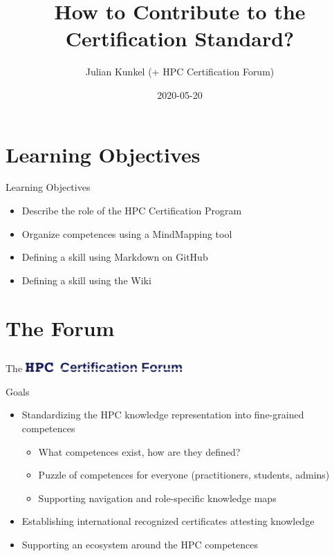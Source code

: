 \documentclass[compress,aspectratio=169]{beamer}
\subtitle{}
\title{\Large  How to Contribute to the Certification Standard?}
\author{Julian Kunkel (+ HPC Certification Forum)}
\date{2020-05-20}
\institute{Department of Computer Science}
\begin{document}
\begin{frame}[plain]{}
	\maketitle
\end{frame}

\section{Learning Objectives}

\begin{frame}{Learning Objectives}
\begin{itemize}
  \item Describe the role of the HPC Certification Program
  \item Organize competences using a MindMapping tool
  \item Defining a skill using Markdown on GitHub
  \item Defining a skill using the Wiki
\end{itemize}
\end{frame}


\section{The Forum}
\subsection{}



\begin{frame}{The \includegraphics[width=0.45\textwidth]{hpccf-full}}
		\begin{block}{Goals}
			\begin{itemize}
				\item Standardizing the HPC knowledge representation into fine-grained competences
          \begin{itemize}
            \item What competences exist, how are they defined?
            \item Puzzle of competences for everyone (practitioners, students, admins)
            \item Supporting navigation and role-specific knowledge maps
          \end{itemize}
				\item Establishing international recognized certificates attesting knowledge
        \item Supporting an ecosystem around the HPC competences
			\end{itemize}
		\end{block}
\end{frame}
\end{document}
